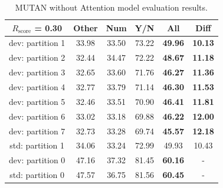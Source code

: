 \documentclass[letterpaper]{article}
\newcommand{\rscore}{}\def\rscore/{$R_{\text{score}}$}
\begin{document}
\begin{table}
	\begin{subtable}{0.49\linewidth}
		\begin{adjustbox}{width=0.46\columnwidth}
\begin{tabular}{c | c c c c | c}
			\rscore/ = 0.30  & Other & Num   & Y/N   & All            & Diff           \\ [0.5ex]
			\hline
			dev: partition 1 & 33.98 & 33.50 & 73.22 & \textbf{49.96} & \textbf{10.13} \\
			dev: partition 2 & 32.44 & 34.47 & 72.22 & \textbf{48.67} & \textbf{11.18} \\
			dev: partition 3 & 32.65 & 33.60 & 71.76 & \textbf{46.27} & \textbf{11.36} \\
			dev: partition 4 & 32.77 & 33.79 & 71.14 & \textbf{46.30} & \textbf{11.53} \\
			dev: partition 5 & 32.46 & 33.51 & 70.90 & \textbf{46.41} & \textbf{11.81} \\
			dev: partition 6 & 33.02 & 33.18 & 69.88 & \textbf{46.22} & \textbf{12.00} \\
			dev: partition 7 & 32.73 & 33.28 & 69.74 & \textbf{45.57} & \textbf{12.18} \\
			\hline
			std: partition 1 & 34.06 & 33.24 & 72.99 & 49.93          & 10.43          \\
			\hline
			dev: partition 0 & 47.16 & 37.32 & 81.45 & \textbf{60.16} & -              \\
			std: partition 0 & 47.57 & 36.75 & 81.56 & \textbf{60.45} & -              \\
			\hline
		\end{tabular}
\end{adjustbox}
		\caption{MUTAN without Attention model evaluation results.}


\end{subtable}
\end{table}
\end{document}
